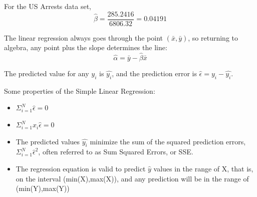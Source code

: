 \documentclass[nohyper,justified]{tufte-handout}\usepackage[]{graphicx}\usepackage[]{color}
\begin{document}
For the US Arrests data set, 
\begin{equation*}
\hat{\beta}=\frac{285.2416}{6806.32}=0.04191
\end{equation*}

The linear regression always goes through the point $(\bar{x},\bar{y})$, so returning to algebra, any point plus the slope determines the line:
\begin{equation*}
\hat{\alpha}=\bar{y}-\hat{\beta}\bar{x}
\end{equation*}

The predicted value for any $y_i$ is $\hat{y_i}$, and the prediction error is $\hat{\epsilon}=y_i - \hat{y_i}$.

Some properties of the Simple Linear Regression:
\begin{itemize}
  \item $\Sigma_{i=1}^{N} \hat{\epsilon}=0 $
  \item $\Sigma_{i=1}^{N} x_i \hat{\epsilon}=0 $
  \item The predicted values $\hat{y_i}$ minimize the sum of the squared prediction errors, $\Sigma_{i=1}^{N} \hat{\epsilon}^2$, often referred to as Sum Squared Errors, or SSE.
  \item The regression equation is valid to predict $\hat{y}$ values in the range of X, that is, on the interval (min(X),max(X)), and any prediction will be in the range of (min(Y),max(Y))
\end{itemize}
\end{document}

